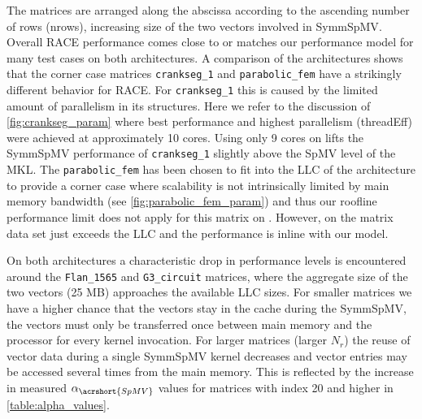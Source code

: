 The matrices are arranged along the abscissa according to the ascending number of rows (\acrshort{nrows}), \ie increasing size of the two vectors involved in \acrshort{SymmSpMV}. Overall \acrshort{RACE}  performance comes close to or matches our performance model for many test cases on both architectures. 
A comparison of the architectures shows that the corner case matrices \texttt{crankseg\_1} and \texttt{parabolic\_fem} have a strikingly different behavior for \acrshort{RACE}. For \texttt{crankseg\_1} this is caused by the limited amount of parallelism in its structures. Here we refer to the discussion of \cref{fig:crankseg_param} where best performance and highest parallelism (\acrshort{threadEff}) were achieved at approximately 10 cores. Using only 9 cores on \SKX lifts the \acrshort{SymmSpMV} performance of  \texttt{crankseg\_1} slightly above the \acrshort{SpMV} level of the MKL. The \texttt{parabolic\_fem} has been chosen to fit into the LLC of the \SKX architecture to provide a corner case where scalability is not intrinsically limited by main memory bandwidth (see  \cref{fig:parabolic_fem_param}) and thus our roofline performance limit does not apply for this matrix on \SKX. However, on \IVB the matrix data set just exceeds the LLC and the performance is inline with our model. 

On both architectures a characteristic drop in performance levels is encountered around the \texttt{Flan\_1565} and \texttt{G3\_circuit} matrices, where the aggregate size of the two vectors (25 MB) approaches the available LLC sizes. For smaller matrices we have a higher chance that the vectors stay in the cache during the \acrshort{SymmSpMV}, \ie the vectors must only be transferred once between main memory and the processor for every kernel invocation. 
For larger matrices (\ie larger $N_r$) the reuse of vector data during a single \acrshort{SymmSpMV} kernel decreases and vector entries may be accessed several times from the main memory. This is reflected by the increase in measured $\alpha_{\acrshort{SpMV}}$ values for matrices with index 20 and higher in \cref{table:alpha_values}. 

